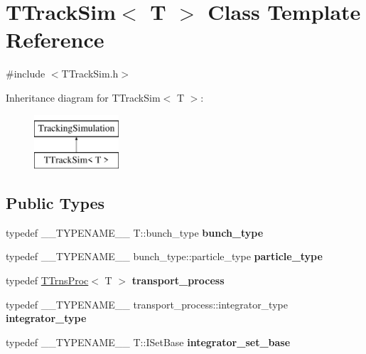 \hypertarget{classTTrackSim}{}\section{T\+Track\+Sim$<$ T $>$ Class Template Reference}
\label{classTTrackSim}


{\ttfamily \#include $<$T\+Track\+Sim.\+h$>$}

Inheritance diagram for T\+Track\+Sim$<$ T $>$\+:\begin{figure}[H]
\begin{center}
\leavevmode
\includegraphics[height=2.000000cm]{classTTrackSim}
\end{center}
\end{figure}
\subsection*{Public Types}
\begin{DoxyCompactItemize}
\item 
\mbox{\label{classTTrackSim_a93515d6708626282fa993d53ad3078e4}} 
typedef \+\_\+\+\_\+\+T\+Y\+P\+E\+N\+A\+M\+E\+\_\+\+\_\+ T\+::bunch\+\_\+type {\bfseries bunch\+\_\+type}
\item 
\mbox{\label{classTTrackSim_aa6402ccd32454b4fb336158dd0311047}} 
typedef \+\_\+\+\_\+\+T\+Y\+P\+E\+N\+A\+M\+E\+\_\+\+\_\+ bunch\+\_\+type\+::particle\+\_\+type {\bfseries particle\+\_\+type}
\item 
\mbox{\label{classTTrackSim_af8cbfc672207f9641ffbfc3745a7cec8}} 
typedef \hyperlink{classTTrnsProc}{T\+Trns\+Proc}$<$ T $>$ {\bfseries transport\+\_\+process}
\item 
\mbox{\label{classTTrackSim_a2213d1c1dd13edee2d7d481387a28f65}} 
typedef \+\_\+\+\_\+\+T\+Y\+P\+E\+N\+A\+M\+E\+\_\+\+\_\+ transport\+\_\+process\+::integrator\+\_\+type {\bfseries integrator\+\_\+type}
\item 
\mbox{\label{classTTrackSim_a71d23f3d78b9a70fadafc19df3e3f24d}} 
typedef \+\_\+\+\_\+\+T\+Y\+P\+E\+N\+A\+M\+E\+\_\+\+\_\+ T\+::\+I\+Set\+Base {\bfseries integrator\+\_\+set\+\_\+base}
\end{DoxyCompactItemize}
